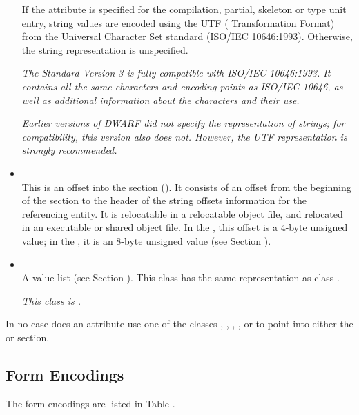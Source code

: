 \begin{itemize}
If the \DWATuseUTFeight{}
 attribute is specified for the
compilation, partial, skeleton or type unit entry, string values are encoded using the
UTF ( Transformation Format) from the Universal
Character Set standard (ISO/IEC 10646:1993).
Otherwise, the string representation is unspecified.

\textit{The  Standard Version 3 is fully compatible with
ISO/IEC 10646:1993. 
It contains all the same characters
and encoding points as ISO/IEC 10646, as well as additional
information about the characters and their use.}

\textit{Earlier versions of DWARF did not specify the representation
of strings; for compatibility, this version also does
not. However, the UTF representation is strongly recommended.}

\item \CLASSstroffsetsptr \\
This is an offset into the \dotdebugstroffsets{} section 
(\DWFORMsecoffset). It consists of an offset from the beginning of the 
\dotdebugstroffsets{} section to the
\bb
header
\eb
of the string offsets information for the
referencing entity. It is relocatable in
a relocatable object file, and relocated in an executable or
shared object file. In the \thirtytwobitdwarfformat, this offset
is a 4-byte unsigned value; in the \sixtyfourbitdwarfformat,
it is an 8-byte unsigned value (see Section
).

\bb
\item \CLASSvallist \\
A value list (see Section ).
This class has the same representation as class \CLASSloclist.

\textit{This class is \newinversionx.}
\eb

\end{itemize}

In no case does an attribute use one of the classes 
\CLASSaddrptr,
\CLASSlineptr,
\CLASSloclistsptr, 
\CLASSmacptr, 
\CLASSrnglistsptr{} or 
\CLASSstroffsetsptr{}
to point into either the
\dotdebuginfo{} or \dotdebugstr{} section.

\subsection{Form Encodings}
\label{datarep:formencodings}
The form encodings are listed in 
Table .


